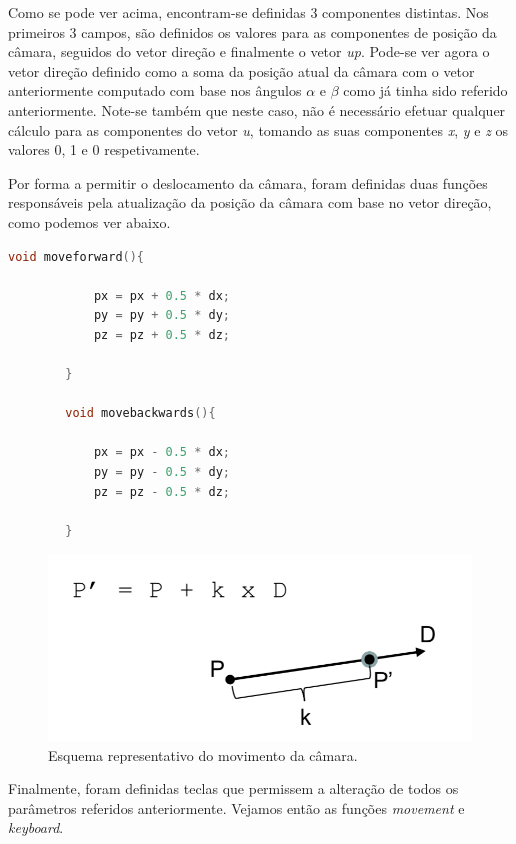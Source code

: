 \documentclass[a4paper]{article}
\begin{document}
Como se pode ver acima, encontram-se definidas 3 componentes distintas. Nos primeiros 3 campos, são definidos os valores para as componentes de posição da câmara, seguidos do vetor direção e finalmente o vetor \textit{up}. Pode-se ver agora o vetor direção definido como a soma da posição atual da câmara com o vetor anteriormente computado com base nos ângulos $\alpha$ e $\beta$ como já tinha sido referido anteriormente. Note-se também que neste caso, não é necessário efetuar qualquer cálculo para as componentes do vetor \textit{u}, tomando as suas componentes \textit{x}, \textit{y} e \textit{z} os valores 0, 1 e 0 respetivamente.

Por forma a permitir o deslocamento da câmara, foram definidas duas funções responsáveis pela atualização da posição da câmara com base no vetor direção, como podemos ver abaixo.

\begin{lstlisting}[language=C++, caption=Definição das funções responsáveis pelo movimento para frente e trás da câmara.]
        void moveforward(){

            px = px + 0.5 * dx;
            py = py + 0.5 * dy;
            pz = pz + 0.5 * dz;

        }

        void movebackwards(){

            px = px - 0.5 * dx;
            py = py - 0.5 * dy;
            pz = pz - 0.5 * dz;

        }
\end{lstlisting}

\begin{figure}[!h]
    \centering
    \includegraphics[width=0.5\linewidth]{referencial_FPS2.png}
    \caption{Esquema representativo do movimento da câmara.}
    \label{fig:ref_FPS3}
\end{figure}

Finalmente, foram definidas teclas que permissem a alteração de todos os parâmetros referidos anteriormente. Vejamos então as funções \textit{movement} e \textit{keyboard}.
\end{document}

